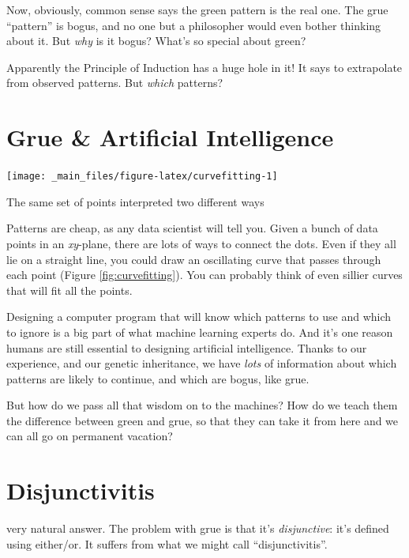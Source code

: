 \documentclass[justified]{tufte-book}
\begin{document}
Now, obviously, common sense says the green pattern is the real one. The grue ``pattern'' is bogus, and no one but a philosopher would even bother thinking about it. But \emph{why} is it bogus? What's so special about green?

Apparently the Principle of Induction has a huge hole in it! It says to extrapolate from observed patterns. But \emph{which} patterns?

\hypertarget{grue-artificial-intelligence}{%
\section*{Grue \& Artificial Intelligence}\label{grue-artificial-intelligence}}

\begin{marginfigure}
\texttt{[image: \_main\_files/figure-latex/curvefitting-1]} \caption[The same set of points interpreted two different ways]{The same set of points interpreted two different ways}\label{fig:curvefitting}
\end{marginfigure}

Patterns are cheap, as any data scientist will tell you. Given a bunch of data points in an \emph{xy}-plane, there are lots of ways to connect the dots. Even if they all lie on a straight line, you could draw an oscillating curve that passes through each point (Figure \ref{fig:curvefitting}). You can probably think of even sillier curves that will fit all the points.

Designing a computer program that will know which patterns to use and which to ignore is a big part of what machine learning experts do. And it's one reason humans are still essential to designing artificial intelligence. Thanks to our experience, and our genetic inheritance, we have \emph{lots} of information about which patterns are likely to continue, and which are bogus, like grue.

But how do we pass all that wisdom on to the machines? How do we teach them the difference between green and grue, so that they can take it from here and we can all go on permanent vacation?

\hypertarget{disjunctivitis}{%
\section*{Disjunctivitis}\label{disjunctivitis}}

 very natural answer. The problem with grue is that it's \emph{disjunctive}: it's defined using either/or. It suffers from what we might call ``disjunctivitis''.
\end{document}
